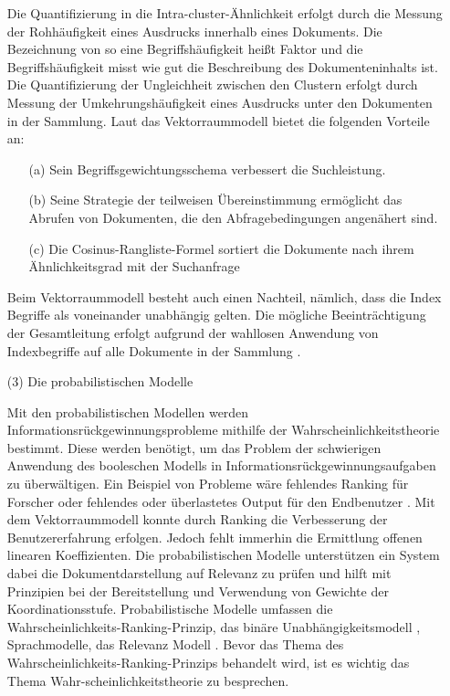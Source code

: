 \begin{itemize}
Die Quantifizierung in die Intra-cluster-Ähnlichkeit erfolgt durch die Messung der Rohhäufigkeit eines Ausdrucks innerhalb eines Dokuments. Die Bezeichnung von so eine Begriffshäufigkeit heißt Faktor und die Begriffshäufigkeit misst wie gut die Beschreibung des Dokumenteninhalts ist. Die Quantifizierung der Ungleichheit zwischen den Clustern erfolgt durch Messung der Umkehrungshäufigkeit eines Ausdrucks unter den Dokumenten in der Sammlung. Laut \cite{BRI99} das Vektorraummodell bietet die folgenden Vorteile an:

	\begin{itemize}
	\item[(a)]Sein Begriffsgewichtungsschema verbessert die Suchleistung.
\end{itemize}
	\begin{itemize}
	\item[(b)]Seine Strategie der teilweisen Übereinstimmung ermöglicht das Abrufen von Dokumenten, die den Abfragebedingungen angenähert sind.
\end{itemize}
	\begin{itemize}
	\item[(c)]Die Cosinus-Rangliste-Formel sortiert die Dokumente nach ihrem Ähnlichkeitsgrad mit der Suchanfrage
\end{itemize}
	
	Beim Vektorraummodell besteht auch einen Nachteil, nämlich, dass die Index Begriffe als voneinander unabhängig gelten. Die mögliche Beeinträchtigung der Gesamtleitung erfolgt aufgrund der wahllosen Anwendung von Indexbegriffe auf alle Dokumente in der Sammlung \cite{BRI99}.  

	\item[(3)]Die probabilistischen Modelle 

Mit den probabilistischen Modellen werden Informationsrückgewinnungsprobleme mithilfe der Wahrscheinlichkeitstheorie bestimmt. Diese werden benötigt, um das Problem der schwierigen Anwendung des booleschen Modells in Informationsrückgewinnungsaufgaben zu überwältigen. Ein Beispiel von Probleme wäre fehlendes Ranking für Forscher oder fehlendes oder überlastetes Output für den Endbenutzer \cite{MEL15}. Mit dem Vektorraummodell konnte durch Ranking die Verbesserung der Benutzererfahrung erfolgen. Jedoch fehlt immerhin die Ermittlung offenen linearen Koeffizienten. Die probabilistischen Modelle unterstützen ein System dabei die Dokumentdarstellung auf Relevanz zu prüfen und hilft mit Prinzipien bei der Bereitstellung und Verwendung von Gewichte der Koordinationsstufe. Probabilistische Modelle umfassen die Wahrscheinlichkeits-Ranking-Prinzip, das binäre Unabhängigkeitsmodell \cite{MRS08}, Sprachmodelle, das Relevanz Modell \cite{MEL15}. Bevor das Thema des Wahrscheinlichkeits-Ranking-Prinzips behandelt wird, ist es wichtig das Thema Wahr-scheinlichkeitstheorie zu besprechen.


\end{itemize}
